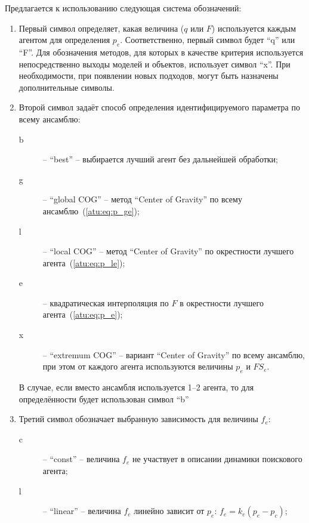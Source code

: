 Предлагается к использованию следующая система обозначений:

\begin{enumerate}

  \item  Первый символ определяет, какая величина ($q$ или $F$) используется
    каждым агентом для определения $p_e$. Соответственно, первый символ
    будет ``q'' или ``F''.
    Для обозначения методов, для которых в качестве критерия используется
    непосредственно выходы моделей и объектов, использует символ ``x''.
    При необходимости, при появлении новых подходов,
    могут быть назначены дополнительные символы.

  \item
    Второй символ задаёт способ определения идентифицируемого параметра по всему ансамблю:
    \begin{description}

      \item[b]  -- ``best'' -- выбирается лучший агент без дальнейшей обработки;

      \item[g]  -- ``global COG'' -- метод ``Center of Gravity'' по всему ансамблю~(\ref{atu:eq:p_ge});

      \item[l] -- ``local COG'' --   метод ``Center of Gravity'' по окрестности лучшего агента~(\ref{atu:eq:p_le});

      \item[e] -- квадратическая интерполяция по $F$ в окрестности лучшего агента~(\ref{atu:eq:p_e});

      \item[x] -- ``extremum COG'' -- вариант ``Center of Gravity'' по всему ансамблю, при этом
        от каждого агента используются величины $p_e$ и $FS_e$.

    \end{description}

    В случае, если вместо ансамбля используется 1--2 агента, то для определённости будет
    использован символ ``b''

  \item
    Третий символ обозначает выбранную зависимость для величины $f_e$:
    \begin{description}

      \item[c]  -- ``const'' -- величина $f_e$ не участвует в описании
        динамики поискового агента;

      \item[l] -- ``linear'' --  величина $f_e$ линейно зависит
        от $p_e$: $f_e = k_e ( p_e - p_c )$;


\end{description}
\end{enumerate}
